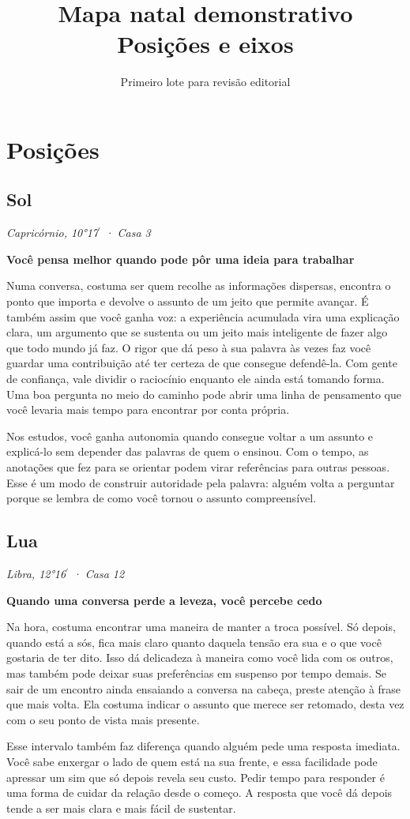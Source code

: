 \documentclass[11pt,a4paper]{article}
\title{Mapa natal demonstrativo\\Posições e eixos}
\author{Primeiro lote para revisão editorial}
\date{}
\newcommand{\leitura}[3]{\subsection{#1}\textit{#2}\par #3}
\newcommand{\subtituloleitura}[1]{\textbf{#1}\par\nopagebreak[4]}
\begin{document}
\maketitle

\section{Posições}

\leitura{Sol}{Capricórnio, 10°17\ensuremath{^{\prime}} · Casa 3}{
\subtituloleitura{Você pensa melhor quando pode pôr uma ideia para trabalhar} Numa conversa, costuma ser quem recolhe as informações dispersas, encontra o ponto que importa e devolve o assunto de um jeito que permite avançar. É também assim que você ganha voz: a experiência acumulada vira uma explicação clara, um argumento que se sustenta ou um jeito mais inteligente de fazer algo que todo mundo já faz. O rigor que dá peso à sua palavra às vezes faz você guardar uma contribuição até ter certeza de que consegue defendê-la. Com gente de confiança, vale dividir o raciocínio enquanto ele ainda está tomando forma. Uma boa pergunta no meio do caminho pode abrir uma linha de pensamento que você levaria mais tempo para encontrar por conta própria.

Nos estudos, você ganha autonomia quando consegue voltar a um assunto e explicá-lo sem depender das palavras de quem o ensinou. Com o tempo, as anotações que fez para se orientar podem virar referências para outras pessoas. Esse é um modo de construir autoridade pela palavra: alguém volta a perguntar porque se lembra de como você tornou o assunto compreensível.
}

\leitura{Lua}{Libra, 12°16\ensuremath{^{\prime}} · Casa 12}{
\subtituloleitura{Quando uma conversa perde a leveza, você percebe cedo} Na hora, costuma encontrar uma maneira de manter a troca possível. Só depois, quando está a sós, fica mais claro quanto daquela tensão era sua e o que você gostaria de ter dito. Isso dá delicadeza à maneira como você lida com os outros, mas também pode deixar suas preferências em suspenso por tempo demais. Se sair de um encontro ainda ensaiando a conversa na cabeça, preste atenção à frase que mais volta. Ela costuma indicar o assunto que merece ser retomado, desta vez com o seu ponto de vista mais presente.

Esse intervalo também faz diferença quando alguém pede uma resposta imediata. Você sabe enxergar o lado de quem está na sua frente, e essa facilidade pode apressar um sim que só depois revela seu custo. Pedir tempo para responder é uma forma de cuidar da relação desde o começo. A resposta que você dá depois tende a ser mais clara e mais fácil de sustentar.
}
\end{document}
